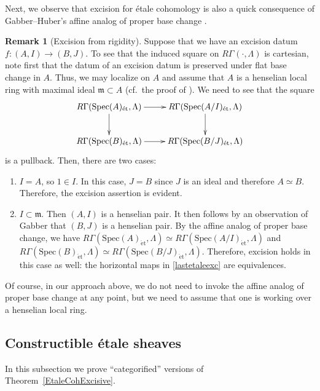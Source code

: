 \documentclass[reqno]{amsart}
\newcommand{\et}{\mathrm{\acute{e}t}}
\theoremstyle{definition}
\newtheorem{remark}[theorem]{Remark}
\begin{document}
Next, we observe that excision for \'etale cohomology is also a quick
consequence of Gabber--Huber's affine analog of proper base change \cite{Gabber, Huber}. 

\begin{remark}[Excision from rigidity]
\label{r}
Suppose that we have an excision datum $f\colon  (A, I) \to (B, J)$. 
To see that the induced square on $R \Gamma_{}( \cdot, \Lambda)$ is
 cartesian, 
 note first that the datum of
an excision datum is preserved under flat base change in $A$. 
 Thus, we may localize on $A$ and assume that $A $ is a henselian
local ring with maximal ideal $\mathfrak{m} \subset A$ (cf.~the proof of
). We need to see that the square 
\begin{equation} \label{lastetaleexc} \xymatrix{
R \Gamma( \mathrm{Spec}(A)_{\et} , \Lambda) \ar[d]  \ar[r] &  R \Gamma( \mathrm{Spec}(A/I)_{\et}, \Lambda)
\ar[d]  \\
R \Gamma( \mathrm{Spec}(B)_{\et}, \Lambda) \ar[r] &  R \Gamma( \mathrm{Spec}(B/J)_{\et}, \Lambda)
} \end{equation}
is a pullback. 
Then,  there are two cases: 
\begin{enumerate}
\item $I = A$, so $1 \in I$. In this case,  $J = B$ since $J$ is an ideal and
therefore $A \simeq B$. Therefore, the excision  assertion
 is evident. 
\item $I \subset \mathfrak{m}$. Then $(A, I)$ is a henselian pair. It
then follows by an observation of Gabber \cite{Gabberpair} that $(B, J)$ is a henselian pair. 
By the affine analog of proper base change, we have
$R \Gamma( \mathrm{Spec}(A)_{\et}, \Lambda) \simeq R \Gamma( \mathrm{Spec}(A/I)_{\et}, \Lambda)$ and $R
\Gamma( \mathrm{Spec}(B)_{\et}, \Lambda) \simeq R \Gamma( \mathrm{Spec}(B/J)_{\et}, \Lambda)$. Therefore,
excision holds in this case as well: the horizontal maps in
\eqref{lastetaleexc} are equivalences. 
\end{enumerate}
Of course, in our approach above, we do not need to invoke the affine analog of
proper base change at any point, but we need to assume that one is working over
a henselian local ring. 
\end{remark} 

\subsection{Constructible \'etale sheaves}
In this subsection we prove ``categorified'' versions of
Theorem~\ref{EtaleCohExcisive}.
\end{document}
